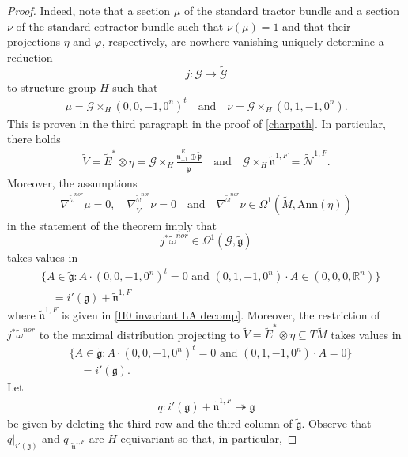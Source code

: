 \documentclass[11pt]{amsart}
\begin{document}
\begin{proof}
Indeed, note that a section $\mu$ of the standard tractor bundle and a section $\nu$ of the standard cotractor bundle such that $\nu(\mu)=1$ and that their projections $\eta$ and $\varphi$, respectively, are nowhere vanishing uniquely determine a reduction 
\[j:\mathcal G\to\tilde{\mathcal G}\]
to structure group $H$ such that 
\begin{align*}
    \mu=\mathcal G\times_H(0,0,-1,0^n)^t\quad\text{and}\quad \nu=\mathcal G\times_H(0,1,-1,0^n).
\end{align*}
This is proven in the third paragraph in the proof of \cref{charpath}. In particular, there holds
\begin{align}\label{H modules geometric meaning}
    \tilde V=\tilde E^*\otimes\eta=\mathcal G\times_H\frac{\tilde{\mathfrak n}_{-1}^E\oplus\tilde{\mathfrak p}}{\tilde{\mathfrak p}}\quad\text{and}\quad\mathcal G\times_H\tilde{\mathfrak n}^{1,F}=\tilde{\mathcal N}^{1,F}.
\end{align}
Moreover, the assumptions
\begin{align*}
    \nabla^{\tilde\omega^{nor}}\mu=0,
    \quad\nabla^{\tilde\omega^{nor}}_{\tilde V}\nu=0
    \quad\text{and}\quad
    \nabla^{\tilde\omega^{nor}}\nu\in\Omega^1(\tilde M,\mathrm{Ann}(\eta))
\end{align*}
in the statement of the theorem imply that 
\[j^*\tilde\omega^{nor}\in
\Omega^1(\mathcal G,\tilde{\mathfrak g})\] 
takes values in 
\begin{align*}
&\{A\in\tilde{\mathfrak g}:A\cdot(0,0,-1,0^n)^t=0\text{ and }(0,1,-1,0^n)\cdot A\in(0,0,0,\mathbb R^n)\}\\
&\quad=i'(\mathfrak g)+\tilde{\mathfrak n}^{1,F}
\end{align*}
where $\tilde{\mathfrak n}^{1,F}$ is given in \cref{H0 invariant LA decomp}. Moreover, the restriction of $j^*\tilde\omega^{nor}$ to the maximal distribution projecting to $\tilde V=\tilde E^*\otimes\eta\subseteq T\tilde M$ takes values in
\begin{align*}
&\{A\in\tilde{\mathfrak g}:A\cdot(0,0,-1,0^n)^t=0\text{ and }(0,1,-1,0^n)\cdot A=0\}\\
&\quad=i'(\mathfrak g).
\end{align*}
Let
\begin{align*}
q:i'(\mathfrak g)+\tilde{\mathfrak n}^{1,F}\twoheadrightarrow\mathfrak g
\end{align*}
be given by deleting the third row and the third column of $\tilde{\mathfrak g}$. Observe that $q|_{i'(\mathfrak g)}$ and $q|_{\tilde{\mathfrak n}^{1,F}}$ are $H$-equivariant so that, in particular,

\end{proof}
\end{document}
